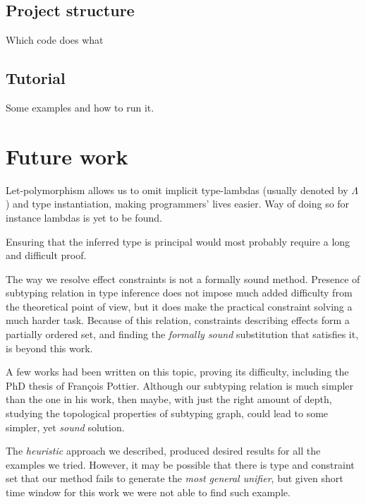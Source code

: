\documentclass[declaration,shortabstract]{iithesis}
\theoremstyle{definition} \newtheorem{definition}{Definition}[section]
\begin{document}
\section{Project structure}
Which code does what

\section{Tutorial}
Some examples and how to run it.

\chapter{Future work}
Let-polymorphism allows us to omit implicit type-lambdas
(usually denoted by $\Lambda$) and type instantiation, making programmers'
lives easier.
Way of doing so for instance lambdas is yet to be found.

Ensuring that the inferred type is principal would most probably require a long
and difficult proof.

The way we resolve effect constraints is not a formally sound method.
Presence of subtyping relation in type inference does not impose
much added difficulty from the theoretical point of view,
but it does make the practical constraint solving a much harder task.
Because of this relation, constraints describing effects
form a partially ordered set, and finding the \textit{formally sound}
substitution that satisfies it, is beyond this work.

A few works had been written on this topic, proving its difficulty,
including the PhD thesis of François Pottier\cite{francois}.
Although our subtyping relation is much simpler than the one in his work,
then maybe, with just the right amount of depth,
studying the topological properties of subtyping graph,
could lead to some simpler, yet \textit{sound} solution.

The \textit{heuristic} approach we described, produced desired results
for all the examples we tried.
However, it may be possible that there is type and constraint set that our method
fails to generate the \textit{most general unifier}, but given short time window for
this work we were not able to find such example.

\end{document}
